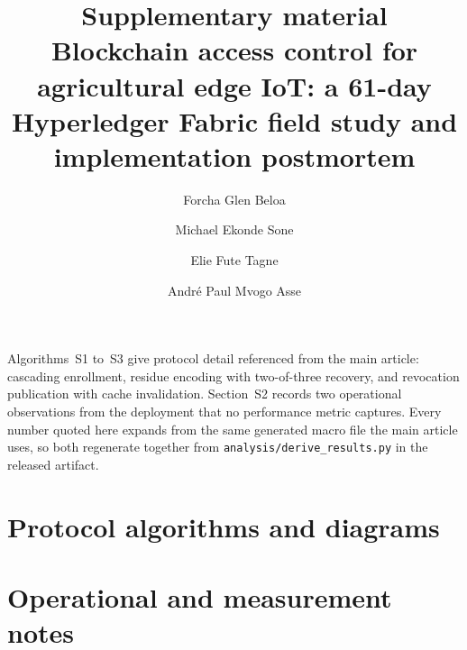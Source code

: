 \documentclass[a4paper,11pt]{article}
\title{Supplementary material\\
  \large Blockchain access control for agricultural edge IoT: a 61-day\\
  Hyperledger Fabric field study and implementation postmortem}
\author{Forcha Glen Beloa \and Michael Ekonde Sone \and Elie Fute Tagne
  \and Andr\'{e} Paul Mvogo Asse}
\date{}
\begin{document}
\maketitle

\noindent
Algorithms~S1 to~S3 give protocol detail referenced from the main article:
cascading enrollment, residue encoding with two-of-three recovery, and
revocation publication with cache invalidation. Section~S2 records two
operational observations from the deployment that no performance metric
captures. Every number quoted here expands from the same generated macro file
the main article uses, so both regenerate together from
\texttt{analysis/derive\_results.py} in the released artifact.

\section{Protocol algorithms and diagrams}
\label{sec:supp_algorithms}



\clearpage
\section{Operational and measurement notes}
\label{sec:supp_operational}



\clearpage




\end{document}
